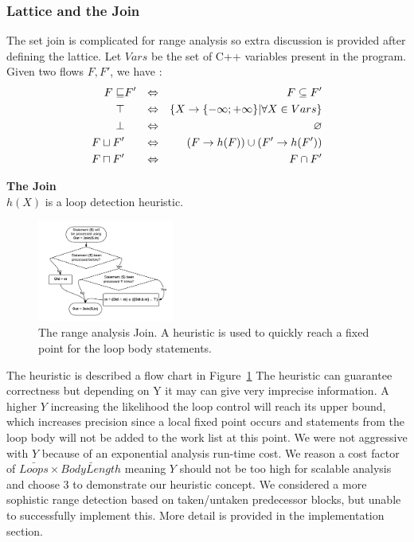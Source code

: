 \subsubsection{Lattice and the Join}
The set join is complicated for range analysis so extra discussion is provided after defining the lattice.
Let $Vars$ be the set of C++ variables present in the program. Given two flows $F,F'$, we have :
\begin{align*}
F \sqsubseteq & F'  & \Leftrightarrow & & F \subseteq F' \\
\top & & \Leftrightarrow & & \{ X \rightarrow \{-\infty; +\infty\} | \forall X \in Vars \}\\ 
\bot & & \Leftrightarrow & & \varnothing \\ 
F \sqcup F' & & \Leftrightarrow & & (F \rightarrow h(F)) \cup (F'\rightarrow h(F')) \\
F \sqcap F' & & \Leftrightarrow & & F \cap F'
\end{align*}

\textbf{The Join}\\
$h(X)$ is a loop detection heuristic. 
\begin{figure}[here]
\includegraphics[width=0.4\textwidth]{loopDetector}
\caption{The range analysis Join. A heuristic is used to quickly reach a fixed point for the loop body statements.}
\label{LoopDetectHeuristic}
\end{figure}

The heuristic is described a flow chart in Figure~\ref{LoopDetectHeuristic}
The heuristic can guarantee correctness but depending on Y it may can give very imprecise information. A higher $Y$ increasing the likelihood the loop control will reach its upper bound, which increases precision since a local fixed point occurs and statements from the loop body will not be added to the work list at this point. We were not aggressive with $Y$ because of an exponential analysis run-time cost. We reason a cost factor of $\bar{Loops} \times \bar{BodyLength}$ meaning $Y$ should not be too high for scalable analysis and choose 3 to demonstrate our heuristic concept. We considered a more sophistic range detection based on taken/untaken predecessor blocks, but unable to successfully implement this. More detail is provided in the implementation section.

